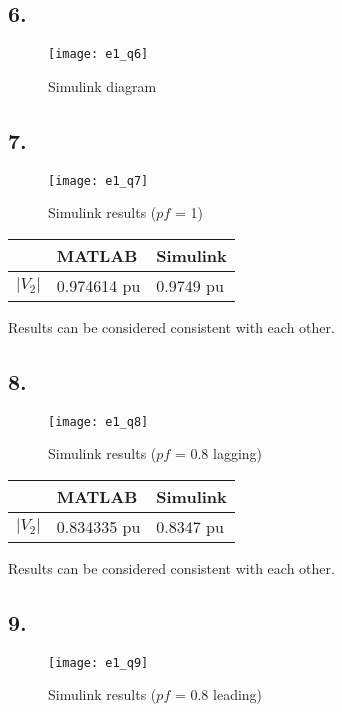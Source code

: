 \documentclass{article}
\begin{document}
\subsection*{6.}
\begin{figure}[H]
\centering
\texttt{[image: e1\_q6]}
\caption{Simulink diagram}
\end{figure}

\subsection*{7.}
\begin{figure}[H]
\centering
\texttt{[image: e1\_q7]}
\caption{Simulink results ($pf$ = 1)}
\end{figure}

\begin{tabu} to \textwidth {XXX}
\toprule
&MATLAB &Simulink\\
\hline
$|V_2|$ &0.974614 pu &0.9749 pu\\
\bottomrule
\end{tabu}

\vspace{9pt}
Results can be considered consistent with each other.

\subsection*{8.}
\begin{figure}[H]
\centering
\texttt{[image: e1\_q8]}
\caption{Simulink results ($pf$ = 0.8 lagging)}
\end{figure}

\begin{tabu} to \textwidth {XXX}
\toprule
&MATLAB &Simulink\\
\hline
$|V_2|$ &0.834335 pu &0.8347 pu\\
\bottomrule
\end{tabu}

\vspace{9pt}
Results can be considered consistent with each other.

\subsection*{9.}
\begin{figure}[H]
\centering
\texttt{[image: e1\_q9]}
\caption{Simulink results ($pf$ = 0.8 leading)}
\end{figure}
\end{document}
